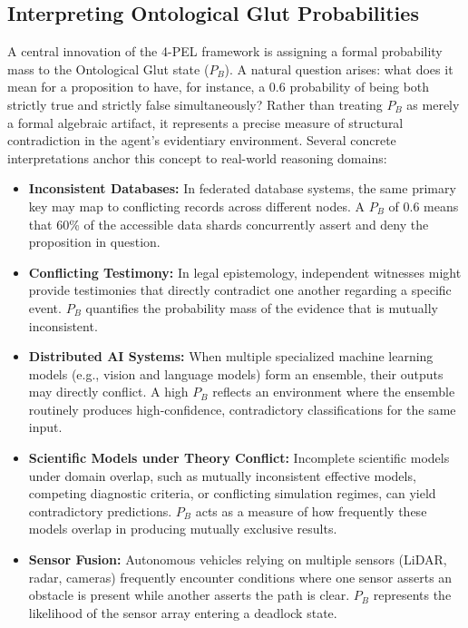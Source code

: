 \documentclass[11pt,a4paper]{article}
\begin{document}
\subsection{Interpreting Ontological Glut Probabilities}
\label{sec:interpretation}

A central innovation of the 4-PEL framework is assigning a formal probability mass to the Ontological Glut state ($P_B$). A natural question arises: what does it mean for a proposition to have, for instance, a 0.6 probability of being both strictly true and strictly false simultaneously? Rather than treating $P_B$ as merely a formal algebraic artifact, it represents a precise measure of structural contradiction in the agent's evidentiary environment. Several concrete interpretations anchor this concept to real-world reasoning domains:

\begin{itemize}
    \item \textbf{Inconsistent Databases:} In federated database systems, the same primary key may map to conflicting records across different nodes. A $P_B$ of 0.6 means that 60\% of the accessible data shards concurrently assert and deny the proposition in question.
    \item \textbf{Conflicting Testimony:} In legal epistemology, independent witnesses might provide testimonies that directly contradict one another regarding a specific event. $P_B$ quantifies the probability mass of the evidence that is mutually inconsistent.
    \item \textbf{Distributed AI Systems:} When multiple specialized machine learning models (e.g., vision and language models) form an ensemble, their outputs may directly conflict. A high $P_B$ reflects an environment where the ensemble routinely produces high-confidence, contradictory classifications for the same input.
    \item \textbf{Scientific Models under Theory Conflict:} Incomplete scientific models under domain overlap, such as mutually inconsistent effective models, competing diagnostic criteria, or conflicting simulation regimes, can yield contradictory predictions. $P_B$ acts as a measure of how frequently these models overlap in producing mutually exclusive results.
    \item \textbf{Sensor Fusion:} Autonomous vehicles relying on multiple sensors (LiDAR, radar, cameras) frequently encounter conditions where one sensor asserts an obstacle is present while another asserts the path is clear. $P_B$ represents the likelihood of the sensor array entering a deadlock state.
\end{itemize}
\end{document}
